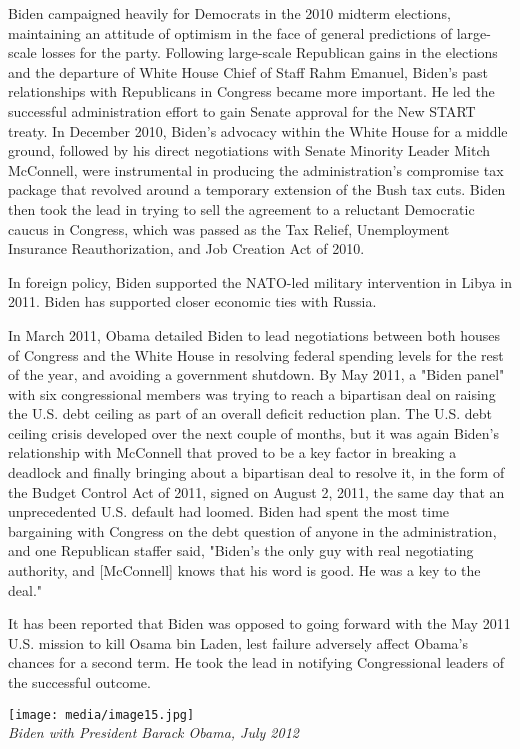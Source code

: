 Biden campaigned heavily for Democrats in the 2010 midterm elections,
maintaining an attitude of optimism in the face of general predictions
of large-scale losses for the party. Following large-scale Republican
gains in the elections and the departure of White House Chief of Staff
Rahm Emanuel, Biden's past relationships with Republicans in Congress
became more important. He led the successful administration effort to
gain Senate approval for the New START treaty. In December 2010, Biden's
advocacy within the White House for a middle ground, followed by his
direct negotiations with Senate Minority Leader Mitch McConnell, were
instrumental in producing the administration's compromise tax package
that revolved around a temporary extension of the Bush tax cuts. Biden
then took the lead in trying to sell the agreement to a reluctant
Democratic caucus in Congress, which was passed as the Tax Relief,
Unemployment Insurance Reauthorization, and Job Creation Act of 2010.

In foreign policy, Biden supported the NATO-led military intervention in
Libya in 2011. Biden has supported closer economic ties with Russia.

In March 2011, Obama detailed Biden to lead negotiations between both
houses of Congress and the White House in resolving federal spending
levels for the rest of the year, and avoiding a government shutdown. By
May 2011, a "Biden panel" with six congressional members was trying to
reach a bipartisan deal on raising the U.S. debt ceiling as part of an
overall deficit reduction plan. The U.S. debt ceiling crisis developed
over the next couple of months, but it was again Biden's relationship
with McConnell that proved to be a key factor in breaking a deadlock and
finally bringing about a bipartisan deal to resolve it, in the form of
the Budget Control Act of 2011, signed on August 2, 2011, the same day
that an unprecedented U.S. default had loomed. Biden had spent the most
time bargaining with Congress on the debt question of anyone in the
administration, and one Republican staffer said, "Biden's the only guy
with real negotiating authority, and {[}McConnell{]} knows that his word
is good. He was a key to the deal."

It has been reported that Biden was opposed to going forward with the
May 2011 U.S. mission to kill Osama bin Laden, lest failure adversely
affect Obama's chances for a second term. He took the lead in notifying
Congressional leaders of the successful outcome.

\texttt{[image: media/image15.jpg]}\\
\emph{Biden with President Barack Obama, July 2012}

